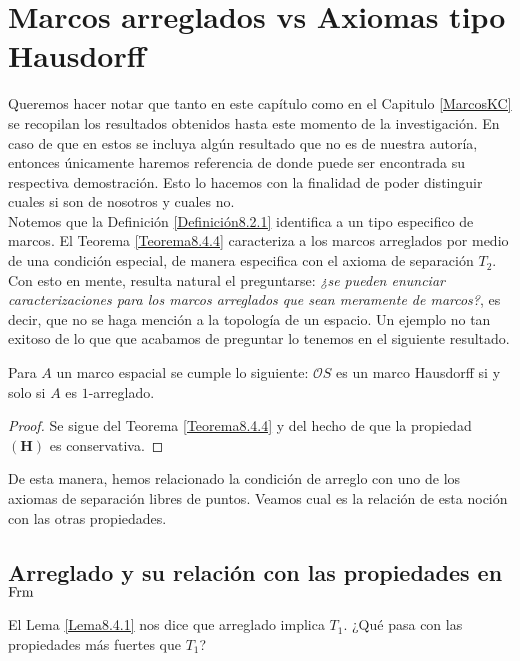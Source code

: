 \chapter{Marcos arreglados vs Axiomas tipo Hausdorff}\label{Relación MA y AH}

Queremos hacer notar que tanto en este capítulo como en el Capitulo \ref{MarcosKC} se recopilan los resultados obtenidos hasta este momento de la investigación. En caso de que en estos se incluya 
algún resultado que no es de nuestra autoría, entonces únicamente haremos referencia de donde puede ser encontrada su respectiva demostración. Esto lo hacemos con la finalidad de poder distinguir 
cuales si son de nosotros y cuales no.\\

Notemos que la Definición \ref{Definición8.2.1} identifica a un tipo especifico de marcos. El Teorema \ref{Teorema8.4.4} caracteriza a los marcos arreglados por medio de una condición especial, de manera especifica con el axioma de separación $T_2$.
Con esto en mente, resulta natural el preguntarse: \emph{¿se pueden enunciar caracterizaciones para los marcos arreglados que sean meramente de marcos?}, es decir, que no se haga mención a la topología de un espacio. Un ejemplo no tan exitoso de lo que 
que acabamos de preguntar lo tenemos en el siguiente resultado.

\begin{cor}\label{TadyHausdorff}
Para $A$ un marco espacial se cumple lo siguiente: $\mathcal{O}S$ es un marco Hausdorff si y solo si $A$ es $1$-arreglado. 
\end{cor}

\begin{proof}
Se sigue del Teorema \ref{Teorema8.4.4} y del hecho de que la propiedad $\mathbf{(H)}$ es conservativa.
\end{proof}

De esta manera, hemos relacionado la condición de arreglo con uno de los axiomas de separación libres de puntos. Veamos cual es la relación de esta noción con las otras propiedades.\\

\section{Arreglado y su relación con las propiedades en $\mathrm{Frm}$}

El Lema \ref{Lema8.4.1} nos dice que arreglado implica $T_1$. ¿Qué pasa con las propiedades más fuertes que $T_1$?


